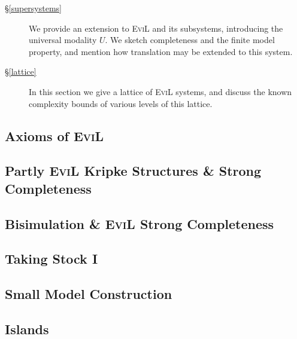 \begin{description}
  \item[\S\ref{supersystems}] We provide an extension to
    \textsc{EviL} and its subsystems, introducing the universal
    modality $U$. We sketch completeness and the finite model
    property, and mention how translation may be extended to this
    system.

 \item[\S\ref{lattice}]  In this section we give a lattice of
   \textsc{EviL} systems, and discuss the known complexity bounds of
   various levels of this lattice.
\end{description}

%

\subsection{Axioms of \textsc{EviL}}\label{evil-axioms}


\pagebreak

\subsection{Partly \textsc{EviL} Kripke Structures \& Strong Completeness}\label{abstraction}\label{partly-evil-strong-soundness-and-completeness}


\subsection{Bisimulation \& \textsc{EviL} Strong Completeness}\label{completely-evil}\label{Abstract-Completeness}


\subsection{Taking Stock I}\label{taking-stock}


\subsection{Small Model Construction}\label{small-model}


\subsection{Islands}\label{islands}


